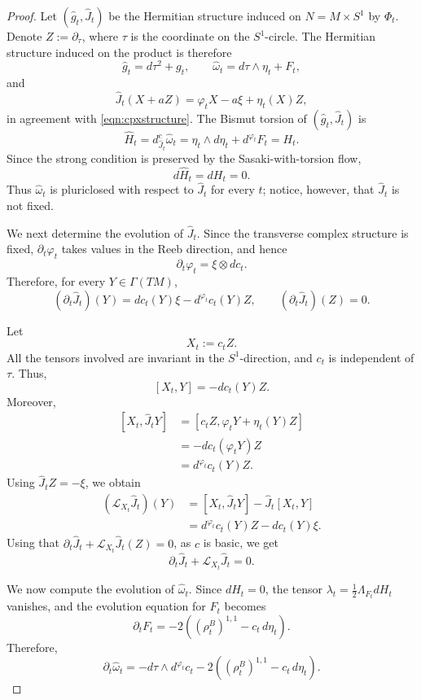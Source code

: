\documentclass[10pt,a4paper]{amsart}
\begin{document}
\begin{proof}
Let $(\widehat g_t,\widehat J_t)$ be the Hermitian structure induced on $N=M \times S^1$ by $\Phi_t$. Denote $Z:=\partial_\tau$, where $\tau$ is the coordinate on the $S^1$-circle. The Hermitian structure induced on the product is therefore 
\[
\widehat g_t=d\tau^2+g_t,
\qquad
\widehat\omega_t=d\tau\wedge\eta_t+F_t,
\]
and
\[
\widehat J_t(X+aZ)
=
\varphi_tX-a\xi+\eta_t(X)Z,
\]
in agreement with \eqref{eqn:cpxstructure}.
The Bismut torsion of $(\widehat g_t,\widehat J_t)$ is \[ \widehat H_t = d^c_{\widehat J_t}\widehat\omega_t = \eta_t\wedge d\eta_t+d^{\varphi_t}F_t = H_t. \] 
Since the strong condition is preserved by the Sasaki-with-torsion flow, \[ d\widehat H_t=dH_t=0. \] Thus $\widehat\omega_t$ is pluriclosed with respect to $\widehat J_t$ for every $t$; notice, however, that
$\widehat J_t$ is not fixed.

We next determine the evolution of $\widehat J_t$. Since the
transverse complex structure is fixed, $\partial_t\varphi_t$ takes
values in the Reeb direction, and hence
\[
\partial_t\varphi_t=\xi\otimes dc_t.
\]
Therefore, for every $Y\in \Gamma(TM)$,
\[
(\partial_t\widehat J_t)(Y)
=
dc_t(Y)\xi-d^{\varphi_t}c_t(Y)Z,
\qquad
(\partial_t\widehat J_t)(Z)=0.
\]

Let
\[
X_t:=c_tZ.
\]
All the tensors involved are invariant in the $S^1$-direction, and
$c_t$ is independent of $\tau$. Thus,
\[
[X_t,Y]=-dc_t(Y)Z.
\]
Moreover,
\[
\begin{aligned}
[X_t,\widehat J_tY]
&=
[c_tZ,\varphi_tY+\eta_t(Y)Z]\\
&=
-dc_t(\varphi_tY)Z\\
&=
d^{\varphi_t}c_t(Y)Z.
\end{aligned}
\]
Using $\widehat J_tZ=-\xi$, we obtain
\[
\begin{aligned}
(\mathcal L_{X_t}\widehat J_t)(Y)
&=
[X_t,\widehat J_tY]
-
\widehat J_t[X_t,Y]\\
&=
d^{\varphi_t}c_t(Y)Z-dc_t(Y)\xi.
\end{aligned}
\]
Using that $\partial_t\widehat J_t
+
\mathcal L_{X_t}\widehat J_t (Z)=0$, as $c$ is basic, we get
\[
\partial_t\widehat J_t
+
\mathcal L_{X_t}\widehat J_t
=
0.
\]

We now compute the evolution of $\widehat\omega_t$. Since $dH_t=0$,
the tensor $\lambda_t=\frac12\Lambda_{F_t}dH_t$ vanishes, and the
evolution equation for $F_t$ becomes
\[
\partial_tF_t
=
-2\left((\rho_t^B)^{1,1}-c_t\,d\eta_t\right).
\]
Therefore,
\begin{equation}
\label{eqn:product-omega-evolution}
\partial_t\widehat\omega_t
=
-d\tau\wedge d^{\varphi_t}c_t
-
2\left((\rho_t^B)^{1,1}-c_t\,d\eta_t\right).
\end{equation}


\end{proof}
\end{document}
